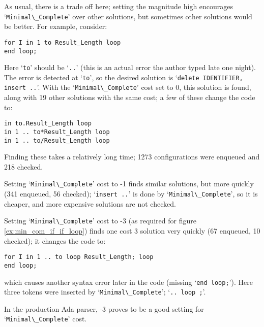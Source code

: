 \documentclass{article}
\newcommand{\code}[1]{`\lstinline|#1|'}
\begin{document}
As usual, there is a trade off here; setting the magnitude high
encourages \code{Minimal\_Complete} over other solutions, but sometimes
other solutions would be better. For example, consider:
\begin{lstlisting}
for I in 1 to Result_Length loop
end loop;
\end{lstlisting}
Here \code{to} should be \code{..} (this is an actual error the author
typed late one night). The error is detected at \code{to}, so the
desired solution is \code{delete IDENTIFIER, insert ..}. With the
\code{Minimal\_Complete} cost set to 0, this solution is found, along
with 19 other solutions with the same cost; a few of these change the
code to:

\begin{lstlisting}
in to.Result_Length loop
in 1 .. to*Result_Length loop
in 1 .. to/Result_Length loop
\end{lstlisting}

Finding these takes a relatively long time; 1273 configurations
were enqueued and 218 checked.

Setting \code{Minimal\_Complete} cost to -1 finds similar solutions,
but more quickly (341 enqueued, 56 checked); \code{insert ..} is done
by \code{Minimal\_Complete}, so it is cheaper, and more expensive
solutions are not checked.

Setting \code{Minimal\_Complete} cost to -3 (as required for
figure \ref{ex:min_com_if_if_loop}) finds one cost 3 solution very
quickly (67 enqueued, 10 checked); it changes the code to:
\begin{lstlisting}
for I in 1 .. to loop Result_Length; loop
end loop;
\end{lstlisting}
which causes another syntax error later in the code (missing
\code{end loop;}). Here three tokens were inserted by
\code{Minimal\_Complete}; \code{.. loop ;}.

In the production Ada parser, -3 proves to be a good setting for
\code{Minimal\_Complete} cost.
\end{document}
